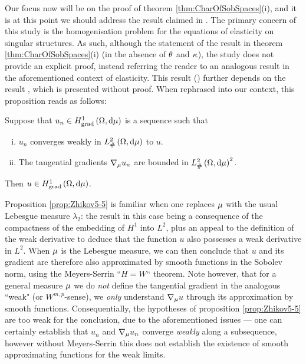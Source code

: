 Our focus now will be on the proof of theorem \ref{thm:CharOfSobSpaces}(i), and it is at this point we should address the result claimed in \cite{zhikov2002homogenization}.
The primary concern of this study is the homogenisation problem for the equations of elasticity on singular structures.
As such, although the statement of the result in theorem \ref{thm:CharOfSobSpaces}(i) (in the absence of $\theta$ and $\kappa$), the study does not provide an explicit proof, instead referring the reader to an analogous result \cite[lemma 6.1]{zhikov2002homogenization} in the aforementioned context of elasticity.
This result (\cite[lemma 6.1]{zhikov2002homogenization}) further depends on the result \cite[proposition 5.5]{zhikov2002homogenization}, which is presented without proof.
When rephrased into our context, this proposition reads as follows:
\begin{prop} \label{prop:Zhikov5-5}
	Suppose that $u_n\in H^1_\mathrm{grad}\left( \Omega, \mathrm{d}\mu \right)$ is a sequence such that
	\begin{enumerate}[(i)]
		\item $u_n$ converges weakly in $L^2_{\#}\left( \Omega,\mathrm{d} \mu \right)$ to $u$.
		\item The tangential gradients $\nabla_{\mu}u_n$ are bounded in $L^2_{\#}\left( \Omega,\mathrm{d} \mu \right)^2$.
	\end{enumerate}
	Then $u\in H^1_\mathrm{grad}\left( \Omega, \mathrm{d}\mu \right)$.
\end{prop}
Proposition \ref{prop:Zhikov5-5} is familiar when one replaces $\mu$ with the usual Lebesgue measure $\lambda_2$: the result in this case being a consequence of the compactness of the embedding of $H^1$ into $L^2$, plus an appeal to the definition of the weak derivative to deduce that the function $u$ also possesses a weak derivative in $L^2$.
When $\mu$ is the Lebesgue measure, we can then conclude that $u$ and its gradient are therefore also approximated by smooth functions in the Sobolev norm, using the Meyers-Serrin ``$H=W$`` theorem.
Note however, that for a general measure $\mu$ we do \emph{not} define the tangential gradient in the analogous ``weak" (or $W^{m,p}$-sense), we \emph{only} understand $\nabla_{\mu}u$ through its approximation by smooth functions.
Consequentially, the hypotheses of proposition \ref{prop:Zhikov5-5} are too weak for the conclusion, due to the aforementioned issues --- one can certainly establish that $u_n$ and $\nabla_{\mu}u_n$ converge \emph{weakly} along a subsequence, however without Meyers-Serrin this does not establish the existence of smooth approximating functions for the weak limits.
